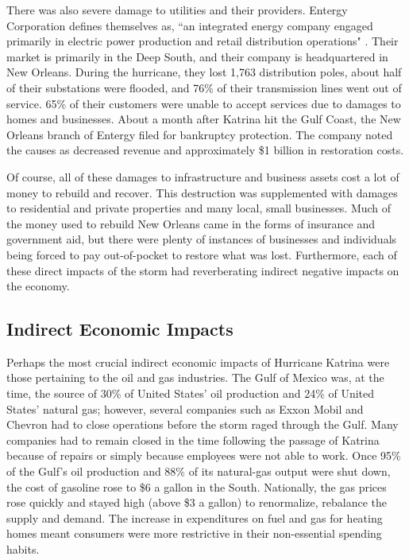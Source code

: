 \documentclass[%
 reprint,
 amsmath,amssymb,
 aps,
]{revtex4-1}
\begin{document}
There was also severe damage to utilities and their providers. Entergy Corporation defines themselves as, ``an integrated energy company engaged primarily in electric power production and retail distribution operations" \cite{entergy}. Their market is primarily in the Deep South, and their company is headquartered in New Orleans. During the hurricane, they lost 1,763 distribution poles, about half of their substations were flooded, and 76\% of their transmission lines went out of service. 65\% of their customers were unable to accept services due to damages to homes and businesses. About a month after Katrina hit the Gulf Coast, the New Orleans branch of Entergy filed for bankruptcy protection. The company noted the causes as decreased revenue and approximately \$1 billion in restoration costs. \cite{walton_2015}

Of course, all of these damages to infrastructure and business assets cost a lot of money to rebuild and recover. This destruction was supplemented with damages to residential and private properties and many local, small businesses. Much of the money used to rebuild New Orleans came in the forms of insurance and government aid, but there were plenty of instances of businesses and individuals being forced to pay out-of-pocket to restore what was lost. Furthermore, each of these direct impacts of the storm had reverberating indirect negative impacts on the economy. 

\subsection{\label{sec:level2} Indirect Economic Impacts}

Perhaps the most crucial indirect economic impacts of Hurricane Katrina were those pertaining to the oil and gas industries. The Gulf of Mexico was, at the time, the source of 30\% of United States' oil production and 24\% of United States' natural gas; however, several companies such as Exxon Mobil and Chevron had to close operations before the storm raged through the Gulf. \cite{laverty_2005} Many companies had to remain closed in the time following the passage of Katrina because of repairs or simply because employees were not able to work. Once 95\% of the Gulf's oil production and 88\% of its natural-gas output were shut down, the cost of gasoline rose to \$6 a gallon in the South. Nationally, the gas prices rose quickly and stayed high (above \$3 a gallon) to renormalize, rebalance the supply and demand. The increase in expenditures on fuel and gas for heating homes meant consumers were more restrictive in their non-essential spending habits. \cite{samuelson_2005} 
\end{document}
